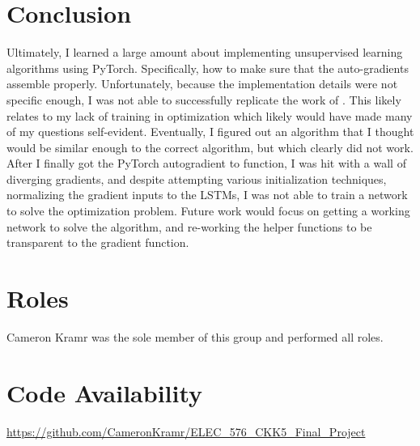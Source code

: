 \documentclass[journal]{IEEEtran}
\begin{document}
\section{Conclusion}
Ultimately, I learned a large amount about implementing unsupervised learning algorithms using PyTorch. Specifically, how to make sure that the auto-gradients assemble properly. Unfortunately, because the implementation details were not specific enough, I was not able to successfully replicate the work of \cite{LSTM_Net}. This likely relates to my lack of training in optimization which likely would have made many of my questions self-evident. Eventually, I figured out an algorithm that I thought would be similar enough to the correct algorithm, but which clearly did not work. After I finally got the PyTorch autogradient to function, I was hit with a wall of diverging gradients, and despite attempting various initialization techniques, normalizing the gradient inputs to the LSTMs, I was not able to train a network to solve the optimization problem. Future work would focus on getting a working network to solve the algorithm, and re-working the helper functions to be transparent to the gradient function.  

\section{Roles}
Cameron Kramr was the sole member of this group and performed all roles.

\section{Code Availability}
\url{https://github.com/CameronKramr/ELEC_576_CKK5_Final_Project}

\nocite{*}


\end{document}
